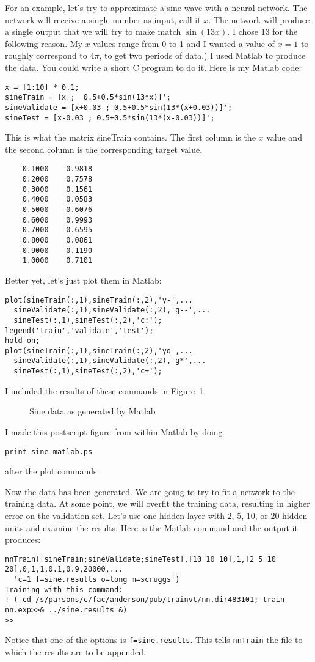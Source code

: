 For an example, let's try to approximate a sine wave with a neural network.
The network will receive a single number as input, call it $x$.  The network
will produce a single output that we will try to make match $\sin(13 x)$. I
chose 13 for the following reason.  My $x$ values range from 0 to 1 and I
wanted a value of $x=1$ to roughly correspond to $4 \pi$, to get two periods
of data.)
I used Matlab to produce the data.  You could write a short C
program to do it.  Here is my Matlab code:
\begin{verbatim}
x = [1:10] * 0.1;
sineTrain = [x ;  0.5+0.5*sin(13*x)]';
sineValidate = [x+0.03 ; 0.5+0.5*sin(13*(x+0.03))]';
sineTest = [x-0.03 ; 0.5+0.5*sin(13*(x-0.03))]';
\end{verbatim}
This is what the matrix sineTrain contains.  The first column is the $x$ value
and the second column is the corresponding target value.
\begin{verbatim}
    0.1000    0.9818
    0.2000    0.7578
    0.3000    0.1561
    0.4000    0.0583
    0.5000    0.6076
    0.6000    0.9993
    0.7000    0.6595
    0.8000    0.0861
    0.9000    0.1190
    1.0000    0.7101
\end{verbatim}
Better yet, let's just plot them in Matlab:
\begin{verbatim}
plot(sineTrain(:,1),sineTrain(:,2),'y-',...
  sineValidate(:,1),sineValidate(:,2),'g--',...
  sineTest(:,1),sineTest(:,2),'c:');
legend('train','validate','test');
hold on;
plot(sineTrain(:,1),sineTrain(:,2),'yo',...
  sineValidate(:,1),sineValidate(:,2),'g*',...
  sineTest(:,1),sineTest(:,2),'c+');
\end{verbatim}
I included the results of these commands in Figure~\ref{sinedata}.
\begin{figure}
\centerline{}
\caption{Sine data as generated by Matlab}
\label{sinedata}
\end{figure}
I made this postscript figure from within Matlab by doing
\begin{verbatim}
print sine-matlab.ps
\end{verbatim}
after the plot commands.

Now the data has been generated.  We are going to try to fit a
network to the training data.  At some point, we will overfit the
training data, resulting in higher error on the validation set.
Let's use one hidden layer with 2, 5, 10, or 20 hidden units and examine the
results.  Here is the Matlab
command and 
the output it produces:
\begin{small}
\begin{verbatim}
nnTrain([sineTrain;sineValidate;sineTest],[10 10 10],1,[2 5 10 20],0,1,1,0.1,0.9,20000,...
  'c=1 f=sine.results o=long m=scruggs')
Training with this command:
! ( cd /s/parsons/c/fac/anderson/pub/trainvt/nn.dir483101; train nn.exp>>& ../sine.results &)
>> 
\end{verbatim}
\end{small}
Notice that one of the options is \verb'f=sine.results'.  This tells
\verb'nnTrain' the file to which the results are to be appended.

